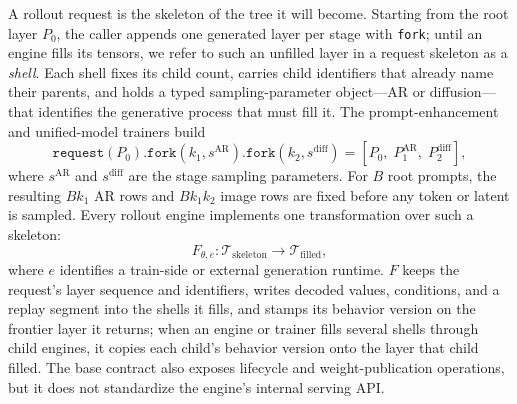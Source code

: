 \documentclass[10pt]{article}
\begin{document}
A rollout request is the skeleton of the tree it will become.
Starting from the root layer $P_0$, the caller appends one generated layer per stage with \texttt{fork}; until an engine fills its tensors, we refer to such an unfilled layer in a request skeleton as a \emph{shell}.
Each shell fixes its child count, carries child identifiers that already name their parents, and holds a typed sampling-parameter object---AR or diffusion---that identifies the generative process that must fill it.
The prompt-enhancement and unified-model trainers build
\begin{equation}
\texttt{request}(P_0).\texttt{fork}(k_1,s^{\mathrm{AR}}).\texttt{fork}(k_2,s^{\mathrm{diff}})
= [P_0,\;P_1^{\mathrm{AR}},\;P_2^{\mathrm{diff}}],
\label{eq:skeleton}
\end{equation}
where $s^{\mathrm{AR}}$ and $s^{\mathrm{diff}}$ are the stage sampling parameters. For $B$ root prompts, the resulting $B k_1$ AR rows and $B k_1 k_2$ image rows are fixed before any token or latent is sampled.
Every rollout engine implements one transformation over such a skeleton:
\begin{equation}
F_{\theta,e}: \mathcal{T}_{\mathrm{skeleton}} \longrightarrow \mathcal{T}_{\mathrm{filled}},
\label{eq:engine}
\end{equation}
where $e$ identifies a train-side or external generation runtime.
$F$ keeps the request's layer sequence and identifiers, writes decoded values, conditions, and a replay segment into the shells it fills, and stamps its behavior version on the frontier layer it returns; when an engine or trainer fills several shells through child engines, it copies each child's behavior version onto the layer that child filled.
The base contract also exposes lifecycle and weight-publication operations, but it does not standardize the engine's internal serving API.
\end{document}
